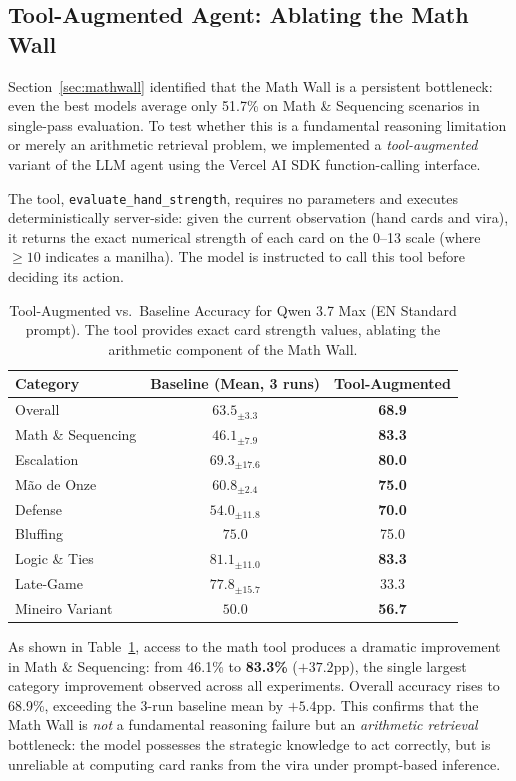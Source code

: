 \documentclass[11pt]{article}
\begin{document}
\subsection{Tool-Augmented Agent: Ablating the Math Wall}
\label{sec:toolagent}

Section~\ref{sec:mathwall} identified that the Math Wall is a persistent bottleneck: even the best models average only 51.7\% on Math \& Sequencing scenarios in single-pass evaluation. To test whether this is a fundamental reasoning limitation or merely an arithmetic retrieval problem, we implemented a \textit{tool-augmented} variant of the LLM agent using the Vercel AI SDK function-calling interface.

The tool, \texttt{evaluate\_hand\_strength}, requires no parameters and executes deterministically server-side: given the current observation (hand cards and vira), it returns the exact numerical strength of each card on the 0--13 scale (where $\geq 10$ indicates a manilha). The model is instructed to call this tool before deciding its action.

\begin{table}[htbp]
\centering
\caption{Tool-Augmented vs.~Baseline Accuracy for Qwen 3.7 Max (EN Standard prompt). The tool provides exact card strength values, ablating the arithmetic component of the Math Wall.}
\label{tab:tool_ablation}
\begin{tabular}{@{}lcc@{}}
\toprule
Category & Baseline (Mean, 3 runs) & Tool-Augmented \\
\midrule
Overall & $63.5_{\pm 3.3}$ & \textbf{68.9} \\
\midrule
Math \& Sequencing & $46.1_{\pm 7.9}$ & \textbf{83.3} \\
Escalation & $69.3_{\pm 17.6}$ & \textbf{80.0} \\
M\~ao de Onze & $60.8_{\pm 2.4}$ & \textbf{75.0} \\
Defense & $54.0_{\pm 11.8}$ & \textbf{70.0} \\
Bluffing & $75.0$ & 75.0 \\
Logic \& Ties & $81.1_{\pm 11.0}$ & \textbf{83.3} \\
Late-Game & \textbf{$77.8_{\pm 15.7}$} & 33.3 \\
Mineiro Variant & $50.0$ & \textbf{56.7} \\
\bottomrule
\end{tabular}
\end{table}

As shown in Table~\ref{tab:tool_ablation}, access to the math tool produces a dramatic improvement in Math \& Sequencing: from 46.1\% to \textbf{83.3\%} ($+37.2$pp), the single largest category improvement observed across all experiments. Overall accuracy rises to 68.9\%, exceeding the 3-run baseline mean by $+5.4$pp. This confirms that the Math Wall is \textit{not} a fundamental reasoning failure but an \textit{arithmetic retrieval} bottleneck: the model possesses the strategic knowledge to act correctly, but is unreliable at computing card ranks from the vira under prompt-based inference.
\end{document}
